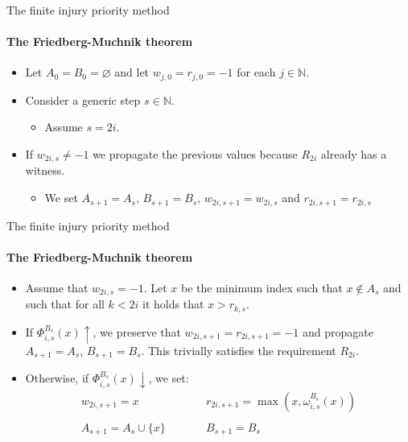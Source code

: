 \documentclass{beamer}
\newcommand{\N}{\mathbb{N}}                     %
\begin{document}
\begin{frame}{The finite injury priority method}
\framesubtitle{The Friedberg-Muchnik theorem}
    \begin{itemize}[<+->]
        \item Let $A_0 = B_0 = \varnothing$ and let $w_{j,0} = r_{j,0} = -1$ for each $j \in \N$.
        \item Consider a generic step $s \in \N$.
        \begin{itemize}
            \item Assume $s = 2i$.
        \end{itemize}
        \item If $w_{2i,s} \neq -1$ we propagate the previous values because $R_{2i}$ already has a witness.
        \begin{itemize}
            \item We set $A_{s+1} = A_s$, $B_{s+1} = B_s$, $w_{2i,s+1} = w_{2i,s}$ and $r_{2i,s+1} = r_{2i,s}$
        \end{itemize} 
    \end{itemize}
\end{frame}

\begin{frame}{The finite injury priority method}
\framesubtitle{The Friedberg-Muchnik theorem}
    \begin{itemize}[<+->]
        \item Assume that $w_{2i,s} = -1$. Let $x$ be the minimum index such that $x \notin A_s$ and such that for all $k < 2i$ it holds that $x > r_{k,s}$.
        \item If $\Phi_{i,s}^{B_s}(x) \uparrow$, we preserve that $w_{2i,s+1} = r_{2i,s+1} = -1$ and propagate $A_{s+1} = A_s$, $B_{s+1} = B_s$. This trivially satisfies the requirement $R_{2i}$.
        \item Otherwise, if $\Phi_{i,s}^{B_s}(x) \downarrow$, we set:
        \[\begin{array}{ccc}
            w_{2i,s+1} = x & \qquad & r_{2i,s+1} = \max(x, \omega_{i,s}^{B_s}(x))\\\\
            A_{s+1} = A_{s} \cup \{x\} & \qquad & B_{s+1} = B_s
        \end{array}\]
    \end{itemize}
\end{frame}
\end{document}
